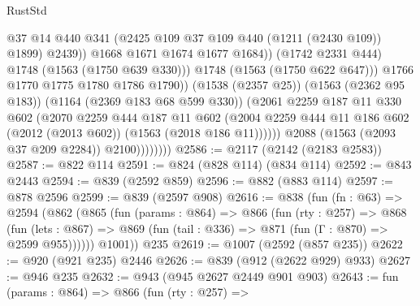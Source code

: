 \begin{lexlean}{RustStd}
\begin{coremodule}
                                      @37
                                      @14
                                      @440
                                      @341
                                      (@2425 @109 @37 @109 @440 (@1211 (@2430 @109)) @1899)
                                      @2439))
                                  @1668
                                  @1671
                                  @1674
                                  @1677
                                  @1684))
                              (@1742 @2331 @444)
                              @1748
                              (@1563 (@1750 @639 @330)))
                            @1748
                            (@1563 (@1750 @622 @647)))
                          @1766
                          @1770
                          @1775
                          @1780
                          @1786
                          @1790))
                      (@1538 (@2357 @25))
                      (@1563 (@2362 @95 @183))
                      (@1164 (@2369 @183 @68 @599 @330))
                      (@2061
                        @2259
                        @187
                        @11
                        @330
                        @602
                        (@2070
                          @2259
                          @444
                          @187
                          @11
                          @602
                          (@2004
                            @2259
                            @444
                            @11
                            @186
                            @602
                            (@2012 (@2013 @602))
                            (@1563 (@2018 @186 @11))))))
                    @2088
                    (@1563 (@2093 @37 @209 @2284))
                    @2100))))))))
@2586 := @2117 (@2142 (@2183 @2583))
@2587 := @822 @114
@2591 := @824 (@828 @114) (@834 @114)
@2592 := @843 @2443
@2594 := @839 (@2592 @859)
@2596 := @882 (@883 @114)
@2597 := @878 @2596
@2599 := @839 (@2597 @908)
@2616 := @838
    (fun (fn : @63) =>
    @2594
      (@862
        (@865
          (fun (params : @864) =>
          @866
            (fun (rty : @257) =>
            @868
              (fun (lets : @867) =>
              @869 (fun (tail : @336) => @871 (fun (Γ : @870) => @2599 @955))))))
        @1001))
    @235
@2619 := @1007 (@2592 (@857 @235))
@2622 := @920 (@921 @235) @2446
@2626 := @839 (@912 (@2622 @929) @933)
@2627 := @946 @235
@2632 := @943 (@945 @2627 @2449 @901 @903)
@2643 := fun (params : @864) =>
  @866
    (fun (rty : @257) =>

\end{coremodule}
\end{lexlean}
